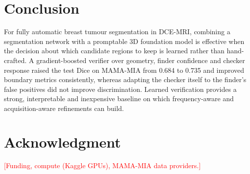 \documentclass[journal]{IEEEtran}
\newcommand{\todo}[1]{\textcolor{red}{[#1]}}
\begin{document}
\section{Conclusion}
For fully automatic breast tumour segmentation in DCE-MRI, combining a segmentation network with a promptable 3D foundation model is effective when the decision about which candidate regions to keep is learned rather than hand-crafted. A gradient-boosted verifier over geometry, finder confidence and checker response raised the test Dice on MAMA-MIA from 0.684 to 0.735 and improved boundary metrics consistently, whereas adapting the checker itself to the finder's false positives did not improve discrimination. Learned verification provides a strong, interpretable and inexpensive baseline on which frequency-aware and acquisition-aware refinements can build.

\section*{Acknowledgment}
\todo{Funding, compute (Kaggle GPUs), MAMA-MIA data providers.}
\end{document}
